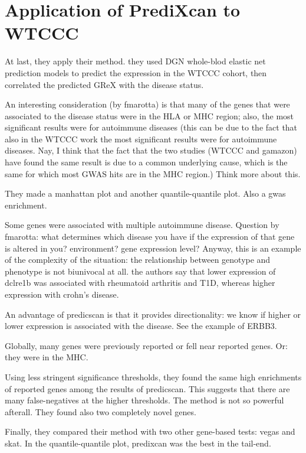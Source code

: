 \documentclass[../main.tex]{subfiles}
\begin{document}
\section{Application of PrediXcan to WTCCC}

At last, they apply their method. they used DGN whole-blod elastic net 
prediction models to predict the expression in the WTCCC cohort, then 
correlated the predicted GReX with the disease status.

An interesting consideration (by fmarotta) is that many of the genes 
that were associated to the disease status were in the HLA or MHC 
region; also, the most significant results were for autoimmune diseases 
(this can be due to the fact that also in the WTCCC work the most 
significant results were for autoimmune diseases. Nay, I think that the 
fact that the two studies (WTCCC and gamazon) have found the same result 
is due to a common underlying cause, which is the same for which most 
GWAS hits are in the MHC region.) Think more about this.

They made a manhattan plot and another quantile-quantile plot. Also a 
gwas enrichment.

Some genes were associated with multiple autoimmune disease. Question by 
fmarotta: what determines which disease you have if the expression of 
that gene is altered in you? environment? gene expression level? Anyway, 
this is an example of the complexity of the situation: the relationship 
between genotype and phenotype is not biunivocal at all. the authors say 
that lower expression of dclre1b was associated with rheumatoid 
arthritis and T1D, whereas higher expression with crohn's disease.

An advantage of predicscan is that it provides directionality: we know 
if higher or lower expression is associated with the disease. See the 
example of ERBB3.

Globally, many genes were previously reported or fell near reported 
genes. Or: they were in the MHC.

Using less stringent significance thresholds, they found the same high 
enrichments of reported genes among the results of predicscan. This 
suggests that there are many false-negatives at the higher thresholds. 
The method is not so powerful afterall. They found also two completely 
novel genes.

Finally, they compared their method with two other gene-based tests: 
vegas and skat. In the quantile-quantile plot, predixcan was the best in 
the tail-end.
\end{document}
